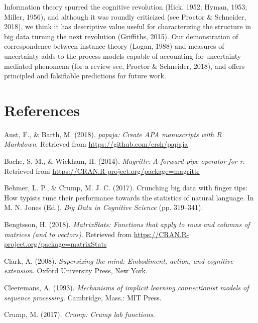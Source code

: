 \documentclass[floatsintext,man]{apa6}
\theoremstyle{definition}
\theoremstyle{definition}
\theoremstyle{definition}
\theoremstyle{remark}
\begin{document}
Information theory spurred the cognitive revolution (Hick, 1952; Hyman,
1953; Miller, 1956), and although it was roundly criticized (see Proctor
\& Schneider, 2018), we think it has descriptive value useful for
characterizing the structure in big data turning the next revolution
(Griffiths, 2015). Our demonstration of correspondence between instance
theory (Logan, 1988) and measures of uncertainty adds to the process
models capable of accounting for uncertainty mediated phenomena (for a
review see, Proctor \& Schneider, 2018), and offers principled and
falsifiable predictions for future work.

\newpage

\section{References}\label{references}

\begingroup
\setlength{\parindent}{-0.5in} \setlength{\leftskip}{0.5in}

\hypertarget{refs}{}
\hypertarget{ref-R-papaja}{}
Aust, F., \& Barth, M. (2018). \emph{papaja: Create APA manuscripts with
R Markdown}. Retrieved from \url{https://github.com/crsh/papaja}

\hypertarget{ref-R-magrittr}{}
Bache, S. M., \& Wickham, H. (2014). \emph{Magrittr: A forward-pipe
operator for r}. Retrieved from
\url{https://CRAN.R-project.org/package=magrittr}

\hypertarget{ref-behmer_crunching_2017}{}
Behmer, L. P., \& Crump, M. J. C. (2017). Crunching big data with finger
tips: How typists tune their performance towards the statistics of
natural language. In M. N. Jones (Ed.), \emph{Big Data in Cognitive
Science} (pp. 319--341).

\hypertarget{ref-R-matrixStats}{}
Bengtsson, H. (2018). \emph{MatrixStats: Functions that apply to rows
and columns of matrices (and to vectors)}. Retrieved from
\url{https://CRAN.R-project.org/package=matrixStats}

\hypertarget{ref-clark_supersizing_2008}{}
Clark, A. (2008). \emph{Supersizing the mind: Embodiment, action, and
cognitive extension}. Oxford University Press, New York.

\hypertarget{ref-cleeremans_mechanisms_1993}{}
Cleeremans, A. (1993). \emph{Mechanisms of implicit learning
connectionist models of sequence processing}. Cambridge, Mass.: MIT
Press.

\hypertarget{ref-R-Crump}{}
Crump, M. (2017). \emph{Crump: Crump lab functions}.
\end{document}
